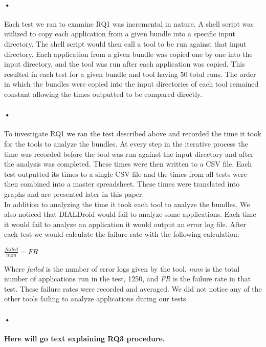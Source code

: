 \documentclass[twocolumn]{article}
\begin{document}
\paragraph{•}
	Each test we ran to examine RQ1 was incremental in nature. A shell script was utilized to copy each application from a given bundle into a specific input directory. The shell script would then call a tool to be run against that input directory. Each application from a given bundle was copied one by one into the input directory, and the tool was run after each application was copied. This resulted in each test for a given bundle and tool having 50 total runs. The order in which the bundles were copied into the input directories of each tool remained constant allowing the times outputted to be compared directly. 
\paragraph{•}
	To investigate RQ1 we ran the test described above and recorded the time it took for the tools to analyze the bundles. At every step in the iterative process the time was recorded before the tool was run against the input directory and after the analysis was completed. These times were then written to a CSV file. Each test outputted its times to a single CSV file and the times from all tests were then combined into a master spreadsheet. These times were translated into graphs and are presented later in this paper.\\
	In addition to analyzing the time it took each tool to analyze the bundles. We also noticed that DIALDroid would fail to analyze some applications. Each time it would fail to analyze an application it would output an error log file. After each test we would calculate the failure rate with the following calculation:\\
	\begin{center}
		\(\frac{failed}{num}=FR\)
	\end{center}
	Where \textit{failed} is the number of error logs given by the tool, \textit{num} is the total number of applications run in the test, 1250, and \textit{FR} is the failure rate  in that test. These failure rates were recorded and averaged. We did not notice any of the other tools failing to analyze applications during our tests.
\paragraph{•}
	
	\textbf{Here will go text explaining RQ3 procedure.}
\end{document}
